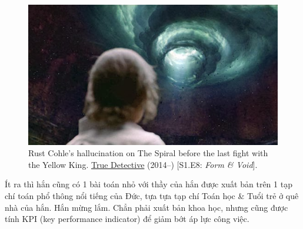 \documentclass[12pt]{article}
\begin{document}
\begin{figure}[H]
	\centering
	\includegraphics[scale=.7]{spiral}
	\caption{Rust Cohle's hallucination on The Spiral before the last fight with the Yellow King. \href{https://www.imdb.com/title/tt2356777/}{True Detective} (2014--) [S1.E8: {\it Form \& Void}].}
\end{figure}
Ít ra thì hắn cũng có 1 bài toán nhỏ với thầy của hắn được xuất bản trên 1 tạp chí toán phổ thông nổi tiếng của Đức, tựa tựa tạp chí Toán học \& Tuổi trẻ ở quê nhà của hắn. Hắn mừng lắm. Chẳn phải xuất bản khoa học, nhưng cũng được tính KPI (key performance indicator) để giảm bớt áp lực công việc.
\end{document}
